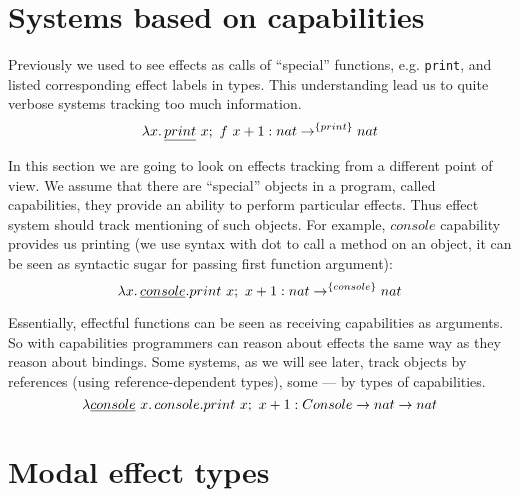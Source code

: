 \documentclass[conference]{IEEEtran}
\newcommand{\seq}{;~}
\newcommand{\ap}{~}
\begin{document}
    \section{Systems based on capabilities} \label{sec:capabilities}

    Previously we used to see effects as calls of ``special'' functions, e.g. \texttt{print}, and listed corresponding effect labels in types.
    This understanding lead us to quite verbose systems tracking too much information.
    \[\lambda x\ldotp \underline{print}\ap x;~f\ap x + 1 : nat \to^{\{print\}} nat\]

    In this section we are going to look on effects tracking from a different point of view.
    We assume that there are ``special'' objects in a program, called capabilities, they provide an ability to perform particular effects.
    Thus effect system should track mentioning of such objects.
    For example, $console$ capability provides us printing (we use syntax with dot to call a method on an object, it can be seen as syntactic sugar for passing first function argument):
    \[\lambda x\ldotp \underline{console}.print\ap x\seq x + 1 : nat \to^{\{console\}} nat\]

    Essentially, effectful functions can be seen as receiving capabilities as arguments.
    So with capabilities programmers can reason about effects the same way as they reason about bindings.
    Some systems, as we will see later, track objects by references (using reference-dependent types), some --- by types of capabilities.
    \[\lambda \underline{console} \ap x \ldotp console.print\ap x\seq x + 1 : Console \to nat \to nat\]






%
%

%
%






    \section{Modal effect types} \label{sec:modal}

\end{document}
